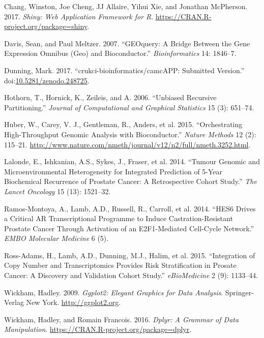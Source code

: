 \documentclass[]{article}
\begin{document}
\hypertarget{ref-shiny}{}
Chang, Winston, Joe Cheng, JJ Allaire, Yihui Xie, and Jonathan
McPherson. 2017. \emph{Shiny: Web Application Framework for R}.
\url{https://CRAN.R-project.org/package=shiny}.

\hypertarget{ref-GEOquery}{}
Davis, Sean, and Paul Meltzer. 2007. ``GEOquery: A Bridge Between the
Gene Expression Omnibus (Geo) and Bioconductor.'' \emph{Bioinformatics}
14: 1846--7.

\hypertarget{ref-github-repo}{}
Dunning, Mark. 2017. ``crukci-bioinformatics/camcAPP: Submitted
Version.''
doi:\href{https://doi.org/10.5281/zenodo.248725}{10.5281/zenodo.248725}.

\hypertarget{ref-party}{}
Hothorn, T., Hornick, K., Zeileis, and A. 2006. ``Unbiased Recursive
Partitioning.'' \emph{Journal of Computational and Graphical Statistics}
15 (3): 651--74.

\hypertarget{ref-BioC}{}
Huber, W., Carey, V. J., Gentleman, R., Anders, et al. 2015.
``Orchestrating High-Throughput Genomic Analysis with Bioconductor.''
\emph{Nature Methods} 12 (2): 115--21.
\url{http://www.nature.com/nmeth/journal/v12/n2/full/nmeth.3252.html}.

\hypertarget{ref-CopyNumber}{}
Lalonde, E., Ishkanian, A.S., Sykes, J., Fraser, et al. 2014. ``Tumour
Genomic and Microenvironmental Heterogeneity for Integrated Prediction
of 5-Year Biochemical Recurrence of Prostate Cancer: A Retrospective
Cohort Study.'' \emph{The Lancet Oncology} 15 (13): 1521--32.

\hypertarget{ref-Hes6}{}
Ramos-Montoya, A., Lamb, A.D., Russell, R., Carroll, et al. 2014. ``HES6
Drives a Critical AR Transcriptional Programme to Induce
Castration-Resistant Prostate Cancer Through Activation of an
E2F1-Mediated Cell-Cycle Network.'' \emph{EMBO Molecular Medicine} 6
(5).

\hypertarget{ref-Ross-Adams}{}
Ross-Adams, H., Lamb, A.D., Dunning, M.J., Halim, et al. 2015.
``Integration of Copy Number and Transcriptomics Provides Risk
Stratification in Prosate Cancer: A Discovery and Validation Cohort
Study.'' \emph{eBioMedicine} 2 (9): 1133--44.

\hypertarget{ref-ggplot2}{}
Wickham, Hadley. 2009. \emph{Ggplot2: Elegant Graphics for Data
Analysis}. Springer-Verlag New York. \url{http://ggplot2.org}.

\hypertarget{ref-dplyr}{}
Wickham, Hadley, and Romain Francois. 2016. \emph{Dplyr: A Grammar of
Data Manipulation}. \url{https://CRAN.R-project.org/package=dplyr}.
\end{document}
